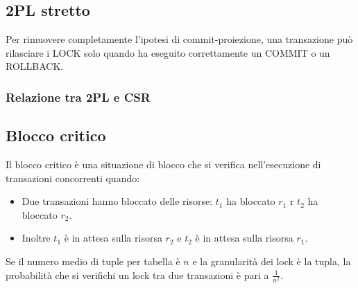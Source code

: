 \documentclass[oneside,a4paper,11pt]{book}
\theoremstyle{italicstyle}
\theoremstyle{normStyle}
\begin{document}
\subsection{2PL stretto}
Per rimuovere completamente l'ipotesi di commit-proiezione, una transazione può rilasciare i LOCK solo quando ha eseguito correttamente un COMMIT o 
un ROLLBACK.
\begin{figure}[H]
  \centering
\end{figure}
\subsubsection{Relazione tra 2PL e CSR}
\begin{figure}[H]
  \centering
\end{figure}
\subsection{Blocco critico}
Il blocco critico è una situazione di blocco che si verifica nell'esecuzione di 
transazioni concorrenti quando:
\begin{itemize}
  \item Due transazioni hanno bloccato delle risorse: $t_1$ ha bloccato $r_1$ 
  r $t_2$ ha bloccato $r_2$.
  \item Inoltre $t_1$ è in attesa sulla risorsa $r_2$ e $t_2$ è in attesa sulla risorsa $r_1$.
\end{itemize}
Se il numero medio di tuple per tabella è $n$ e la granularità dei lock è la tupla,
la probabilità che si verifichi un lock tra due transazioni è pari a $\frac{1}{n^2}$.
\end{document}
